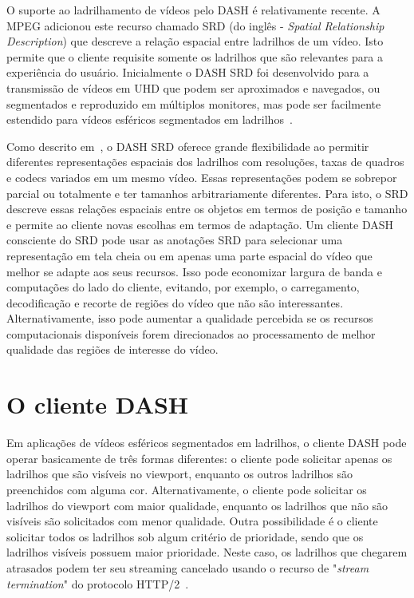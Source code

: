 O suporte ao ladrilhamento de vídeos pelo DASH é relativamente recente. A MPEG adicionou este recurso chamado SRD (do inglês - \textit{Spatial Relationship Description}) que descreve a relação espacial entre ladrilhos de um vídeo. Isto permite que o cliente requisite somente os ladrilhos que são relevantes para a experiência do usuário. Inicialmente o DASH SRD foi desenvolvido para a transmissão de vídeos em UHD que podem ser aproximados e navegados, ou segmentados e reproduzido em múltiplos monitores, mas pode ser facilmente estendido para vídeos esféricos segmentados em ladrilhos~\cite{Lim2015, Hosseini2017, Concolato2017}.

Como descrito em~\cite{Niamut2016}, o DASH SRD oferece grande flexibilidade ao permitir diferentes representações espaciais dos ladrilhos com resoluções, taxas de quadros e codecs variados em um mesmo vídeo. Essas representações podem se sobrepor parcial ou totalmente e ter tamanhos arbitrariamente diferentes. Para isto, o SRD descreve essas relações espaciais entre os objetos em termos de posição e tamanho e permite ao cliente novas escolhas em termos de adaptação. Um cliente DASH consciente do SRD pode usar as anotações SRD para selecionar uma representação em tela cheia ou em apenas uma parte espacial do vídeo que melhor se adapte aos seus recursos. Isso pode economizar largura de banda e computações do lado do cliente, evitando, por exemplo, o carregamento, decodificação e recorte de regiões do vídeo que não são interessantes. Alternativamente, isso pode aumentar a qualidade percebida se os recursos computacionais disponíveis forem direcionados ao processamento de melhor qualidade das regiões de interesse do vídeo.

\section{O cliente DASH}

Em aplicações de vídeos esféricos segmentados em ladrilhos, o cliente DASH pode operar basicamente de três formas diferentes: o cliente pode solicitar apenas os ladrilhos que são visíveis no viewport, enquanto os outros ladrilhos são preenchidos com alguma cor. Alternativamente, o cliente pode solicitar os ladrilhos do viewport com maior qualidade, enquanto os ladrilhos que não são visíveis são solicitados com menor qualidade. Outra possibilidade é o cliente solicitar todos os ladrilhos sob algum critério de prioridade, sendo que os ladrilhos visíveis possuem maior prioridade. Neste caso, os ladrilhos que chegarem atrasados podem ter seu streaming cancelado usando o recurso de "\textit{stream termination}" do protocolo HTTP/2~\cite{Nguyen2024, Xiao2018}.

